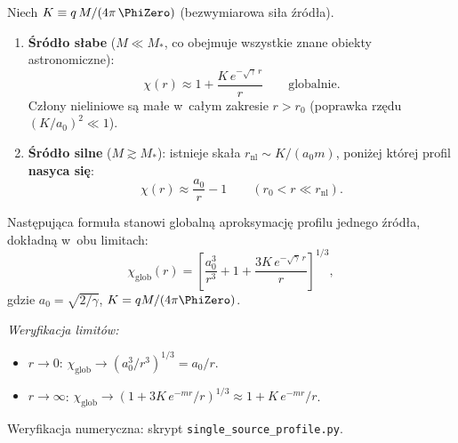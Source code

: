 \begin{proposition}\label{prop:two-regimes-profile}
Niech $K \equiv q\,M/(4\pi\,\PhiZero)$
(bezwymiarowa si\l{}a \'zr\'od\l{}a).

\begin{enumerate}[nosep]
  \item \textbf{\'Sr\'od\l{}o s\l{}abe} ($M \ll M_*$, co obejmuje wszystkie znane
    obiekty astronomiczne):
    \begin{equation}\label{eq:chi-weak}
      \chi(r) \approx 1 + \frac{K\,e^{-\sqrt\gamma\,r}}{r}
      \qquad \text{globalnie}.
    \end{equation}
    Cz\l{}ony nieliniowe s\k{a} ma\l{}e w~ca\l{}ym zakresie $r > r_0$
    (poprawka rz\k{e}du $(K/a_0)^2 \ll 1$).

  \item \textbf{\'Sr\'od\l{}o silne} ($M \gtrsim M_*$):
    istnieje ska\l{}a $r_{\mathrm{nl}} \sim K/(a_0 m)$, poni\.zej kt\'orej
    profil \textbf{nasyca si\k{e}}:
    \begin{equation}\label{eq:chi-strong}
      \chi(r) \approx \frac{a_0}{r} - 1
      \qquad (r_0 < r \ll r_{\mathrm{nl}}).
    \end{equation}
\end{enumerate}
\end{proposition}

\begin{proposition}\label{prop:composite-profile}
Nast\k{e}puj\k{a}ca formu\l{}a stanowi globaln\k{a} aproksymacj\k{e}
profilu jednego \'zr\'od\l{}a, dok\l{}adn\k{a} w~obu limitach:
\begin{equation}\label{eq:chi-composite}
  \boxed{
    \chi_{\mathrm{glob}}(r)
    = \left[\frac{a_0^3}{r^3}
      + 1 + \frac{3K\,e^{-\sqrt\gamma\,r}}{r}\right]^{1/3},
  }
\end{equation}
gdzie $a_0 = \sqrt{2/\gamma}$, $K = qM/(4\pi\PhiZero)$.

\medskip\noindent\emph{Weryfikacja limit\'ow:}
\begin{itemize}[nosep]
  \item $r \to 0$:
    $\chi_{\mathrm{glob}} \to (a_0^3/r^3)^{1/3} = a_0/r$. \checkmark
  \item $r \to \infty$:
    $\chi_{\mathrm{glob}} \to (1 + 3K\,e^{-mr}/r)^{1/3}
    \approx 1 + K\,e^{-mr}/r$. \checkmark
\end{itemize}
Weryfikacja numeryczna: skrypt \texttt{single\_source\_profile.py}.
\end{proposition}

